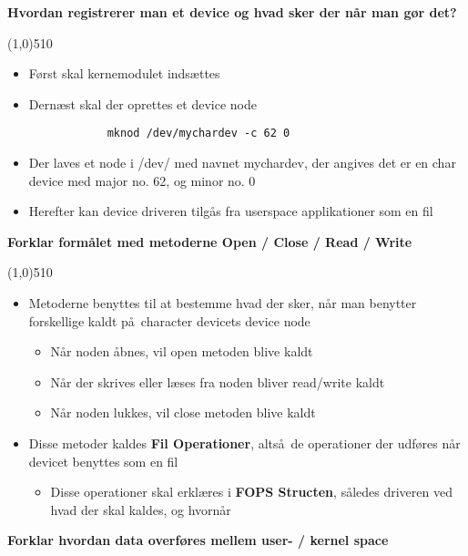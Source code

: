 \documentclass{paper}
\begin{document}
\begin{large}\textbf{Hvordan registrerer man et device og hvad sker der n\aa r man g\o r det?}\end{large}

\line(1,0){510}
\begin{itemize}
	\item F\o rst skal kernemodulet inds\ae ttes
	\item Dern\ae st skal der oprettes et device node\\
		\begin{lstlisting}
			mknod /dev/mychardev -c 62 0
		\end{lstlisting}
	\item Der laves et node i /dev/ med navnet mychardev, der angives det er en char device med major no. 62, og minor no. 0
	\item Herefter kan device driveren tilg\aa s fra userspace applikationer som en fil
	\\
\end{itemize}


\begin{large}\textbf{Forklar form\aa let med metoderne Open / Close / Read / Write}\end{large}

\line(1,0){510}
\begin{itemize}
	\item Metoderne benyttes til at bestemme hvad der sker, n\aa r man benytter forskellige kaldt p\aa\ character devicets device node
	\begin{itemize}
		\item N\aa r noden \aa bnes, vil open metoden blive kaldt
		\item N\aa r der skrives eller l\ae ses fra noden bliver read/write kaldt
		\item N\aa r noden lukkes, vil close metoden blive kaldt
	\end{itemize}
	\item Disse metoder kaldes \textbf{Fil Operationer}, alts\aa\ de operationer der udf\o res n\aa r devicet benyttes som en fil
	\begin{itemize}
		\item Disse operationer skal erkl\ae res i \textbf{FOPS Structen}, s\aa ledes driveren ved hvad der skal kaldes, og hvorn\aa r\\
	\end{itemize}
\end{itemize}


\begin{large}\textbf{Forklar hvordan data overf\o res mellem user- / kernel space}\end{large}
\end{document}
